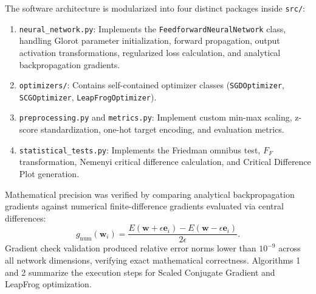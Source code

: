 \documentclass[10pt, conference]{IEEEtran}
\begin{document}
The software architecture is modularized into four distinct packages inside \texttt{src/}:
\begin{enumerate}
    \item[1.] \texttt{neural\_network.py}: Implements the \texttt{FeedforwardNeuralNetwork} class, handling Glorot parameter initialization, forward propagation, output activation transformations, regularized loss calculation, and analytical backpropagation gradients.
    \item[2.] \texttt{optimizers/}: Contains self-contained optimizer classes (\texttt{SGDOptimizer}, \texttt{SCGOptimizer}, \texttt{LeapFrogOptimizer}).
    \item[3.] \texttt{preprocessing.py} and \texttt{metrics.py}: Implement custom min-max scaling, z-score standardization, one-hot target encoding, and evaluation metrics.
    \item[4.] \texttt{statistical\_tests.py}: Implements the Friedman omnibus test, $F_F$ transformation, Nemenyi critical difference calculation, and Critical Difference Plot generation.
\end{enumerate}

Mathematical precision was verified by comparing analytical backpropagation gradients against numerical finite-difference gradients evaluated via central differences:
\begin{equation}
g_{\text{num}}(\mathbf{w}_i) = \frac{E(\mathbf{w} + \epsilon \mathbf{e}_i) - E(\mathbf{w} - \epsilon \mathbf{e}_i)}{2\epsilon}.
\end{equation}
Gradient check validation produced relative error norms lower than $10^{-9}$ across all network dimensions, verifying exact mathematical correctness. Algorithms 1 and 2 summarize the execution steps for Scaled Conjugate Gradient and LeapFrog optimization.
\end{document}
